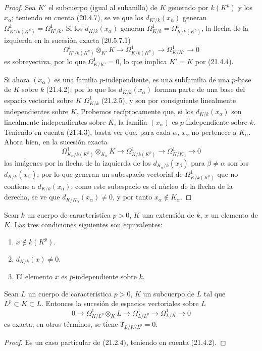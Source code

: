 \begin{proof}
Sea $K'$ el subcuerpo (igual al subanillo) de $K$ generado por
$k(K^p)$ y los $x_\alpha$; teniendo en cuenta (20.4.7), se ve que los
$d_{K'/k}(x_\alpha)$ generan $\Omega^1_{K'/k(K^p)}=\Omega^1_{K'/k}$. Si los
$d_{K/k}(x_\alpha)$ generan $\Omega^1_{K/k}=\Omega^1_{K/k(K^p)}$, la flecha de
la izquierda en la sucesión exacta (20.5.7.1)
\[
\Omega^1_{K'/k(K^p)}\otimes_{K'}K\to\Omega^1_{K/k(K^p)}\to\Omega^1_{K/K'}\to0
\]
es sobreyectiva, por lo que $\Omega^1_{K/K'}=0$, lo que implica $K'=K$ por (21.4.4).

Si ahora $(x_\alpha)$ es una familia $p$-independiente, es una subfamilia
de una $p$-base de $K$ sobre $k$ (21.4.2), por lo que los $d_{K/k}(x_\alpha)$ forman parte
de una base del espacio vectorial sobre $K$ $\Omega^1_{K/k}$ (21.2.5), y son por consiguiente
linealmente independientes sobre $K$. Probemos recíprocamente que, si los
$d_{K/k}(x_\alpha)$ son linealmente independientes sobre $K$, la familia
$(x_\alpha)$ es $p$-independiente sobre $k$.
Teniendo en cuenta (21.4.3), basta ver que,
para cada $\alpha$, $x_\alpha$ no pertenece a $K_\alpha$. Ahora bien, en la
sucesión exacta
\[
\Omega^1_{K_\alpha/k(K^p)}\otimes_{K_\alpha}K\longrightarrow
\Omega^1_{K/k(K^p)}\longrightarrow\Omega^1_{K/K_\alpha}\longrightarrow0
\]
las imágenes por la flecha de la izquierda de los $d_{K_\alpha/k}(x_\beta)$ para
$\beta\neq\alpha$ son los $d_{K/k}(x_\beta)$, por lo que generan un subespacio
vectorial de $\Omega^1_{K/k(K^p)}$ que no contiene a $d_{K/k}(x_\alpha)$; como
este subespacio es el núcleo de la flecha de la derecha, se ve que
$d_{K/K_\alpha}(x_\alpha)\neq0$, y por tanto $x_\alpha\notin K_\alpha$.
\end{proof}

\begin{corollary}[21.4.6]
\label{0.21.4.6-fr}
Sean $k$ un cuerpo de característica $p>0$, $K$ una extensión de $k$,
$x$ un elemento de $K$. Las tres condiciones siguientes son equivalentes:
\begin{enumerate}
  \item[\textup{a)}] $x\notin k(K^p)$.
  \item[\textup{b)}] $d_{K/k}(x)\neq0$.
  \item[\textup{c)}] El elemento $x$ es $p$-independiente sobre $k$.
\end{enumerate}
\end{corollary}

\begin{proposition}[21.4.7]
\label{0.21.4.7-fr}
Sean $L$ un cuerpo de característica $p>0$, $K$ un subcuerpo de $L$ tal
que $L^p\subset K\subset L$. Entonces la sucesión de espacios vectoriales sobre $L$
\begin{equation}
\tag{21.4.7.1}\label{0.21.4.7.1-fr}
0\to\Omega^1_{K/L^p}\otimes_KL\to\Omega^1_{L/L^p}
\to\Omega^1_{L/K}\to0
\end{equation}
es exacta; en otros términos, se tiene $\Upsilon_{L/K/L^p}=0$.
\end{proposition}
\begin{proof}
Es un caso particular de (21.2.4), teniendo en cuenta (21.4.2).
\end{proof}

